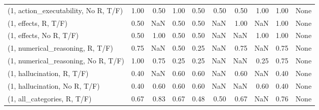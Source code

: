 \begin{table*}[h!]
\begin{adjustbox}{width=2\columnwidth,center}
\begin{tabular}{lrrr|rrr|rrr}
(1, action\_executability, No R, T/F) &                      1.00 &                  0.50 &                      1.00 &                          0.50 &                      0.50 &                          0.50 &                                   1.00 &                               1.00 &                                  None \\
(1, effects, R, T/F)                 &                      0.50 &                   NaN &                      0.50 &                          0.50 &                       NaN &                          1.00 &                                    NaN &                               1.00 &                                  None \\
(1, effects, No R, T/F)              &                      0.50 &                  1.00 &                      0.50 &                          0.50 &                       NaN &                           NaN &                                   1.00 &                               1.00 &                                  None \\
(1, numerical\_reasoning, R, T/F)     &                      0.75 &                   NaN &                      0.50 &                          0.25 &                       NaN &                          0.75 &                                    NaN &                               0.75 &                                  None \\
(1, numerical\_reasoning, No R, T/F)  &                      1.00 &                  0.75 &                      0.25 &                          0.25 &                       NaN &                           NaN &                                   0.25 &                               0.75 &                                  None \\
(1, hallucination, R, T/F)           &                      0.40 &                   NaN &                      0.60 &                          0.60 &                       NaN &                          0.60 &                                    NaN &                               0.40 &                                  None \\
(1, hallucination, No R, T/F)        &                      0.40 &                  0.60 &                      0.60 &                          0.60 &                       NaN &                           NaN &                                   0.60 &                               0.40 &                                  None \\
(1, all\_categories, R, T/F)          &                      0.67 &                  0.83 &                      0.67 &                          0.48 &                      0.50 &                          0.67 &                                    NaN &                               0.76 &                                  None \\

\end{tabular}
\end{adjustbox}
\end{table*}
